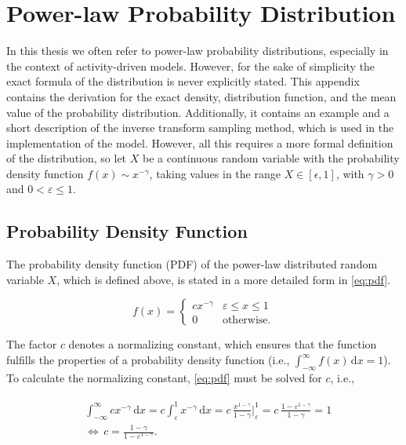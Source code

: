 \chapter{Power-law Probability Distribution}


In this thesis we often refer to power-law probability distributions, especially in the context of activity-driven models.
However, for the sake of simplicity the exact formula of the distribution is never explicitly stated.
This appendix contains the derivation for the exact density, distribution function, and the mean value of the probability distribution.
Additionally, it contains an example and a short description of the inverse transform sampling method, which is used in the implementation of the model.
However, all this requires a more formal definition of the distribution, so let \( X \) be a continuous random variable with the probability density function \( f(x) \sim x^{-\gamma} \), taking values in the range \( X \in [\epsilon, 1] \), with \( \gamma > 0 \) and \( 0 < \varepsilon \leq 1 \).




\section{Probability Density Function}
\label{sec:pdf}

The probability density function (PDF) of the power-law distributed random variable \(X\), which is defined above, is stated in a more detailed form in \cref{eq:pdf}.

\begin{equation}
	f(x) =
	\begin{cases}
		c x^{-\gamma} & \varepsilon \leq x \leq 1 \\
		0             & \text{otherwise.}
	\end{cases}
\label{eq:pdf}
\end{equation}

The factor \( c \) denotes a normalizing constant, which ensures that the function fulfills the properties of a probability density function (i.e., \( \int_{-\infty}^{\infty} f(x) \, \mathrm{d}x = 1 \)).
To calculate the normalizing constant, \cref{eq:pdf} must be solved for \( c \), i.e.,

\begin{align}
\begin{split}
	& \int_{-\infty}^{\infty} cx^{-\gamma} \, \mathrm{d}x = c \int_{\varepsilon}^{1} x^{-\gamma} \, \mathrm{d}x = c \, \frac{x^{1-\gamma}}{1-\gamma}  \bigg |_{\varepsilon}^{1} = c \, \frac{1 - \varepsilon^{1-\gamma}}{1-\gamma} = 1 \\
	& \Leftrightarrow \, c = \frac{1-\gamma}{1 - \varepsilon^{1-\gamma}}.
\end{split}
\label{eq:normalizing-const}
\end{align}


